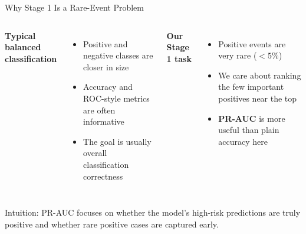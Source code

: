 \begin{frame}{Why Stage 1 Is a Rare-Event Problem}
  \begin{columns}[T,onlytextwidth]
      \centering
      {\bfseries\large Typical balanced\\classification\par}
      \vspace{0.55em}
      \begin{minipage}{0.92\linewidth}
        \begin{itemize}
          \item Positive and negative classes are closer in size
          \item Accuracy and ROC-style metrics are often informative
          \item The goal is usually overall classification correctness
        \end{itemize}
      \end{minipage}

      \centering
      {\color{orange!90!black}\bfseries\large Our Stage 1 task\par}
      \vspace{1.2em}
      \begin{minipage}{0.92\linewidth}
        \begin{itemize}
          \item Positive events are very rare (\(<5\%\))
          \item We care about ranking the few important positives near the top
          \item \textbf{PR-AUC} is more useful than plain accuracy here
        \end{itemize}
      \end{minipage}
  \end{columns}

  \vspace{0.5em}
  \small
  Intuition: PR-AUC focuses on whether the model's high-risk predictions are truly positive and whether rare positive cases are captured early.
\end{frame}
